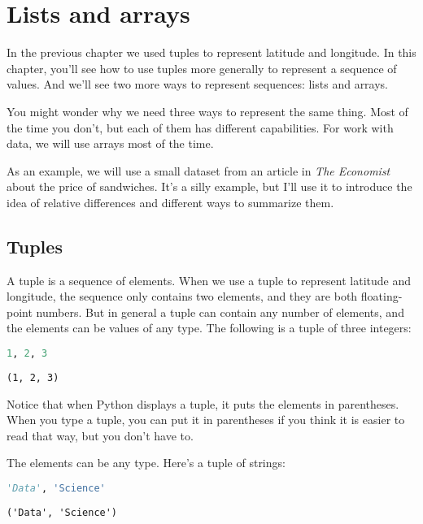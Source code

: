 \hypertarget{lists-and-arrays}{%
\chapter{Lists and arrays}\label{lists-and-arrays}}

In the previous chapter we used tuples to represent latitude and
longitude. In this chapter, you'll see how to use tuples more generally
to represent a sequence of values. And we'll see two more ways to
represent sequences: lists and arrays.

You might wonder why we need three ways to represent the same thing.
Most of the time you don't, but each of them has different capabilities.
For work with data, we will use arrays most of the time.

As an example, we will use a small dataset from an article in \emph{The
Economist} about the price of sandwiches. It's a silly example, but I'll
use it to introduce the idea of relative differences and different ways
to summarize them.

\hypertarget{tuples}{%
\section{Tuples}\label{tuples}}

A tuple is a sequence of elements. When we use a tuple to represent
latitude and longitude, the sequence only contains two elements, and
they are both floating-point numbers. But in general a tuple can contain
any number of elements, and the elements can be values of any type. The
following is a tuple of three integers:

\begin{lstlisting}[language=Python]
1, 2, 3
\end{lstlisting}

\begin{lstlisting}[]
(1, 2, 3)
\end{lstlisting}

Notice that when Python displays a tuple, it puts the elements in
parentheses. When you type a tuple, you can put it in parentheses if you
think it is easier to read that way, but you don't have to.

The elements can be any type. Here's a tuple of strings:

\begin{lstlisting}[language=Python]
'Data', 'Science'
\end{lstlisting}

\begin{lstlisting}[]
('Data', 'Science')
\end{lstlisting}

